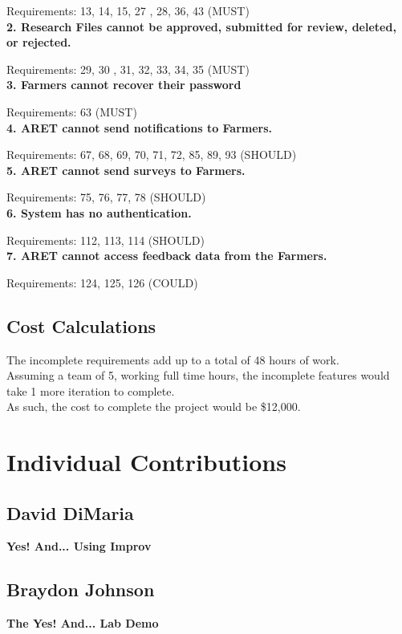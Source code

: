 \documentclass[12pt,letterpaper]{article}
\begin{document}
Requirements: 13, 14, 15, 27 , 28, 36, 43 (MUST)\\
\textbf{2. \hspace{8pt} Research Files cannot be approved, submitted for review, deleted, or rejected.}

Requirements: 29, 30 , 31, 32, 33, 34, 35 (MUST)\\
\textbf{3. \hspace{8pt} Farmers cannot recover their password}

Requirements: 63 (MUST)\\ 
\textbf{4. \hspace{8pt} ARET cannot send notifications to Farmers.}

Requirements: 67, 68, 69, 70, 71, 72, 85, 89, 93 (SHOULD)\\
\textbf{5. \hspace{8pt} ARET cannot send surveys to Farmers.}

Requirements: 75, 76, 77, 78 (SHOULD)\\
\textbf{6. \hspace{8pt} System has no authentication.}

Requirements: 112, 113, 114 (SHOULD)\\
\textbf{7. \hspace{8pt} ARET cannot access feedback data from the Farmers.}

Requirements: 124, 125, 126 (COULD)

\subsection{Cost Calculations}
The incomplete requirements add up to a total of 48 hours of work.\\
Assuming a team of 5, working full time hours, the incomplete features would take 1 more iteration to complete.\\
As such, the cost to complete the project would be \$12,000.

\clearpage
\section{Individual Contributions}
\subsection{David DiMaria}
\textbf{Yes! And... Using Improv}\par


\clearpage
\subsection{Braydon Johnson}
\textbf{The Yes! And... Lab Demo}\par
\end{document}
